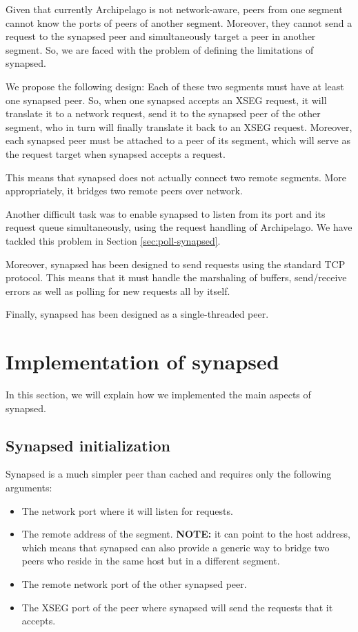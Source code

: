 Given that currently Archipelago is not network-aware, peers from one segment 
cannot know the ports of peers of another segment. Moreover, they cannot send a 
request to the synapsed peer and simultaneously target a peer in another 
segment. So, we are faced with the problem of defining the limitations of 
synapsed.

We propose the following design: Each of these two segments must have at least 
one synapsed peer. So, when one synapsed accepts an XSEG request, it will 
translate it to a network request, send it to the synapsed peer of the other 
segment, who in turn will finally translate it back to an XSEG request.  
Moreover, each synapsed peer must be attached to a peer of its segment, which 
will serve as the request target when synapsed accepts a request.  

This means that synapsed does not actually connect two remote segments. More 
appropriately, it bridges two remote peers over network.

Another difficult task was to enable synapsed to listen from its port and its 
request queue simultaneously, using the request handling of Archipelago. We 
have tackled this problem in Section \ref{sec:poll-synapsed}.

Moreover, synapsed has been designed to send requests using the standard TCP 
protocol.  This means that it must handle the marshaling of buffers, 
send/receive errors as well as polling for new requests all by itself.

Finally, synapsed has been designed as a single-threaded peer.

\section{Implementation of synapsed}\label{sec:imp-synapsed}

In this section, we will explain how we implemented the main aspects of 
synapsed.

\subsection{Synapsed initialization}

Synapsed is a much simpler peer than cached and requires only the following 
arguments:

\begin{itemize}
	\item The network port where it will listen for requests.
	\item The remote address of the segment. \textbf{NOTE:} it can point to 
		the host address, which means that synapsed can also provide a 
		generic way to bridge two peers who reside in the same host but 
		in a different segment.
	\item The remote network port of the other synapsed peer.
	\item The XSEG port of the peer where synapsed will send the requests 
		that it accepts.
\end{itemize}

